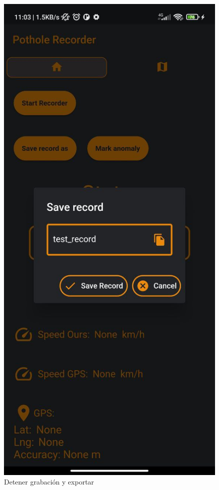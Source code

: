 \begin{figure}[htb]
		\includegraphics[scale = 0.175]{Graphics/apk_save_recording_2.jpg}
		\caption{Detener grabación y exportar}
		\label{fig:7}
	\end{figure}

